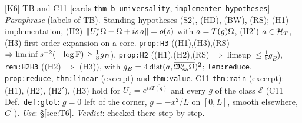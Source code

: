 \documentclass[11pt]{article}
\newcommand{\norm}[1]{\lVert#1\rVert}\newcommand{\abs}[1]{\lvert#1\rvert}\newcommand{\ip}[2]{\langle#1,#2\rangle}
\DeclareMathOperator{\dist}{dist}\DeclareMathOperator{\artanh}{artanh}\DeclareMathOperator{\Ran}{Ran}
\theoremstyle{definition}\newtheorem{hypothesis}[theorem]{Hypothesis}
\begin{document}
\begin{citedbox}{[K6] TB and C11 [cards \texttt{thm-b-universality}, \texttt{implementer-hypotheses}]}
\emph{Paraphrase} (labels of TB).  Standing hypotheses (S2), (HD), (BW), (RS); (H1) implementation,
(H2) $\norm{U_s^*\Om-\Om+is\,a}=o(s)$ with $a=T(g)\Omega$, (H2$'$) $a\in\mathcal H_T$, (H3) first-order expansion on a
core.  \texttt{prop:H3} ((H1),(H3),(RS) $\Rightarrow\liminf s^{-2}(-\log\operatorname{F})\ge\frac18g_B$),
\texttt{prop:H2} ((H1),(H2),(RS) $\Rightarrow\limsup\le\frac18g_B$), \texttt{rem:H2H3} ((H2) $\Rightarrow$
(H3)), with $g_B=4\dist(a,\overline{\cM'_{\rm sa}\Om})^2$; \texttt{lem:reduce}, \texttt{prop:reduce},
\texttt{thm:linear} (excerpt) and \texttt{thm:value}.  C11 \texttt{thm:main} (excerpt): (H1), (H2),
(H2$'$), (H3) hold for $U_s=e^{is\overline{T(g)}}$ and every $g$ of the class $\mathcal E$ (C11
Def.~\texttt{def:gtot}: $g=0$ left of the corner, $g=-x^2/L$ on $[0,L]$, smooth elsewhere, $C^1$).
\emph{Use}: \S\ref{sec:T6}.  \emph{Verdict}: checked there step by step.
\end{citedbox}
\end{document}

